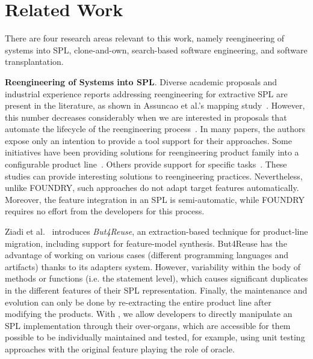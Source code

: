 \section{Related Work} \label{sec:related_work}

There are four research areas relevant to this work, namely reengineering of systems into SPL, clone-and-own, search-based software engineering, and software transplantation.

\textbf{Reengineering of Systems into SPL}. Diverse academic proposals and industrial experience reports addressing reengineering for extractive SPL are present in the literature, as shown in Assuncao et al.’s mapping study~\cite{Assuncao2017}. However, this number decreases considerably when we are interested in proposals that automate the lifecycle of the reengineering process~\cite{Kruger2020}. In many papers, the authors expose only an intention to provide a tool support for their approaches. Some initiatives have been providing solutions for reengineering product family into a configurable product line~\cite{Faust2003, Mende2008, Koschke2007}. Others provide support for specific tasks~\cite{Martinez2015, Alves2007, Nunes2012, Klatt2014, Tang2015}. These studies can provide interesting solutions to reengineering practices. Nevertheless, unlike FOUNDRY, such approaches do not adapt target features automatically. Moreover, the feature integration in an SPL is semi-automatic, while FOUNDRY requires no effort from the developers for this process.

Ziadi et al.~\cite{Ziadi2014} introduces \emph{But4Reuse}, an extraction-based technique for product-line migration, including support for feature-model synthesis. But4Reuse has the advantage of working on various cases (different programming languages and artifacts) thanks to its adapters system. However,  variability within the body of methods or functions (i.e. the statement level), which causes significant duplicates in the different features of their SPL representation. Finally, the maintenance and evolution can only be done by re-extracting the entire product line after modifying the products. With \autoscalpel, we allow developers to directly manipulate an SPL implementation through their over-organs, which are accessible for them possible to be individually maintained and tested, for example, using unit testing approaches with the original feature playing the role of oracle.

